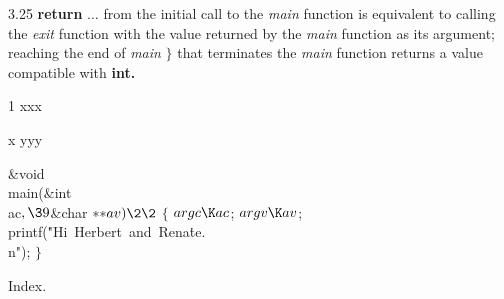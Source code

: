 \vskip 2pt
 3.25 {\bf return} { \rm $\ldots$ from the initial call to the
{\sl main} function is equivalent to calling the {\sl exit} function with the
value returned by the {\sl main} function as its argument; reaching the end of
{\sl main} $\rbrace$ that terminates the {\sl main} function returns a value
compatible with \bf int. }

\item{1} xxx
\item{x} yyy

\Y\B\1\1\&{void} \\{main}(\&{int} \\{ac}${},\39{}$\&{char} ${}{*}{*}\\{av})\2%
\2{}$\6
${}\{{}$\1\6
${}\\{argc}\K\\{ac}{}$;\6
${}\\{argv}\K\\{av}{}$;\6
\\{printf}(\.{"Hi\ Herbert\ and\ Rena}\)\.{te.\\n"});\6
\4${}\}{}$\2\par
\fi

Index.
\fi

\inx
\fin
\con
